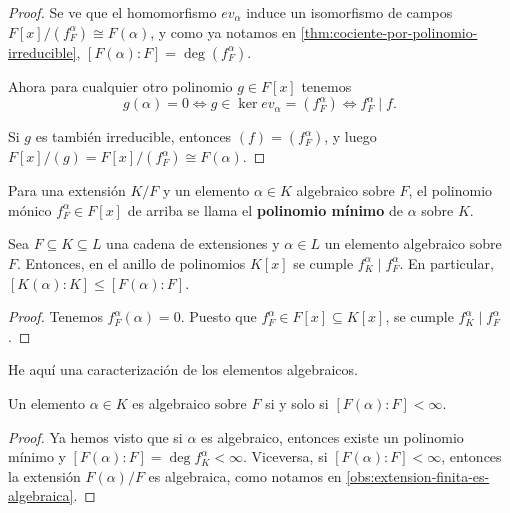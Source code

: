\begin{teorema}
\begin{proof}
    Se ve que el homomorfismo $ev_\alpha$ induce un isomorfismo de campos
    $F [x] / (f^\alpha_F) \cong F (\alpha)$, y como ya notamos en
    \ref{thm:cociente-por-polinomio-irreducible},
    $[F (\alpha) : F] = \deg (f^\alpha_F)$.

    Ahora para cualquier otro polinomio $g \in F[x]$ tenemos
    \[ g (\alpha) = 0 \iff
       g \in \ker ev_\alpha = (f^\alpha_F) \iff
       f^\alpha_F \mid f. \]

    Si $g$ es también irreducible, entonces $(f) = (f^\alpha_F)$, y luego
    $F [x] / (g) = F [x] / (f^\alpha_F) \cong F (\alpha)$.
  \end{proof}
\end{teorema}

\begin{definicion}
  Para una extensión $K/F$ y un elemento $\alpha \in K$ algebraico sobre $F$,
  el polinomio mónico $f^\alpha_F \in F [x]$ de arriba se llama el
  \textbf{polinomio mínimo} de $\alpha$ sobre $K$.
\end{definicion}

\begin{proposicion}
  \label{obs:deg-F-deg-K}
  Sea $F \subseteq K \subseteq L$ una cadena de extensiones y $\alpha \in L$ un
  elemento algebraico sobre $F$. Entonces, en el anillo de polinomios $K [x]$ se
  cumple $f^\alpha_K \mid f^\alpha_F$. En particular,
  $[K (\alpha) : K] \le [F (\alpha) : F]$.

  \begin{proof}
    Tenemos $f^\alpha_F (\alpha) = 0$. Puesto que
    $f^\alpha_F \in F [x] \subseteq K [x]$, se cumple
    $f^\alpha_K \mid f^\alpha_F$.
  \end{proof}
\end{proposicion}

He aquí una caracterización de los elementos algebraicos.

\begin{proposicion}
  Un elemento $\alpha \in K$ es algebraico sobre $F$ si y solo si
  $[F (\alpha) : F] < \infty$.

  \begin{proof}
    Ya hemos visto que si $\alpha$ es algebraico, entonces existe un polinomio
    mínimo y $[F (\alpha) : F] = \deg f^\alpha_K < \infty$. Viceversa, si
    $[F (\alpha) : F] < \infty$, entonces la extensión $F (\alpha)/F$ es
    algebraica, como notamos en \ref{obs:extension-finita-es-algebraica}.
  \end{proof}
\end{proposicion}

